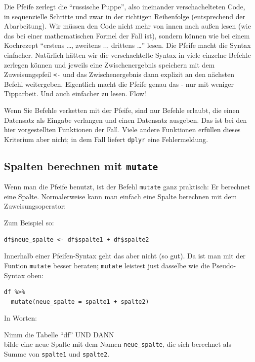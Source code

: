 \documentclass[12pt,ngerman,]{book}
\let\BeginKnitrBlock\begin \let\EndKnitrBlock\end
\begin{document}
Die Pfeife zerlegt die ``russische Puppe'', also ineinander
verschachelteten Code, in sequenzielle Schritte und zwar in der
richtigen Reihenfolge (entsprechend der Abarbeitung). Wir müssen den
Code nicht mehr von innen nach außen lesen (wie das bei einer
mathematischen Formel der Fall ist), sondern können wie bei einem
Kochrezept ``erstens \ldots{}, zweitens .., drittens \ldots{}'' lesen.
Die Pfeife macht die Syntax einfacher. Natürlich hätten wir die
verschachtelte Syntax in viele einzelne Befehle zerlegen können und
jeweils eine Zwischenergebnis speichern mit dem Zuweisungspfeil
\texttt{\textless{}-} und das Zwischenergebnis dann explizit an den
nächsten Befehl weitergeben. Eigentlich macht die Pfeife genau das - nur
mit weniger Tipparbeit. Und auch einfacher zu lesen. Flow!

\BeginKnitrBlock{rmdcaution}
Wenn Sie Befehle verketten mit der Pfeife, sind nur Befehle erlaubt, die
einen Datensatz als Eingabe verlangen und einen Datensatz ausgeben. Das
ist bei den hier vorgestellten Funktionen der Fall. Viele andere
Funktionen erfüllen dieses Kriterium aber nicht; in dem Fall liefert
\texttt{dplyr} eine Fehlermeldung.
\EndKnitrBlock{rmdcaution}

\subsection{\texorpdfstring{Spalten berechnen mit
\texttt{mutate}}{Spalten berechnen mit mutate}}\label{spalten-berechnen-mit-mutate}

Wenn man die Pfeife benutzt, ist der Befehl
\texttt{mutate} ganz praktisch: Er berechnet eine
Spalte. Normalerweise kann man einfach eine Spalte berechnen mit dem
Zuweisungsoperator:

Zum Beispiel so:

\begin{verbatim}
df$neue_spalte <- df$spalte1 + df$spalte2
\end{verbatim}

Innerhalb einer Pfeifen-Syntax geht das aber nicht (so gut). Da ist man
mit der Funtion \texttt{mutate} besser beraten; \texttt{mutate} leistest
just dasselbe wie die Pseudo-Syntax oben:

\begin{verbatim}
df %>% 
  mutate(neue_spalte = spalte1 + spalte2)
\end{verbatim}

In Worten:

\BeginKnitrBlock{rmdpseudocode}
Nimm die Tabelle ``df'' UND DANN\\
bilde eine neue Spalte mit dem Namen \texttt{neue\_spalte}, die sich
berechnet als Summe von \texttt{spalte1} und \texttt{spalte2}.
\EndKnitrBlock{rmdpseudocode}
\end{document}
